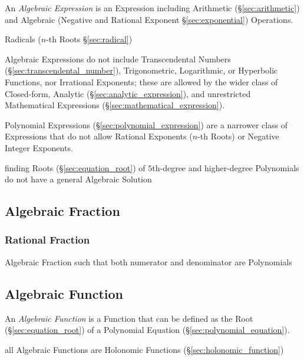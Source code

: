 An \emph{Algebraic Expression} is an Expression including Arithmetic
(\S\ref{sec:arithmetic}) and Algebraic (Negative and Rational Exponent
\S\ref{sec:exponential}) Operations.

Radicals ($n$-th Roots \S\ref{sec:radical})

Algebraic Expressions do not include Transcendental Numbers
(\S\ref{sec:transcendental_number}), Trigonometric, Logarithmic, or Hyperbolic
Functions, nor Irrational Exponents; these are allowed by the wider class of
Closed-form, Analytic (\S\ref{sec:analytic_expression}), and unrestricted
Mathematical Expressions (\S\ref{sec:mathematical_expression}).

\fist Polynomial Expressions (\S\ref{sec:polynomial_expression}) are a narrower
class of Expressions that do not allow Rational Exponents ($n$-th Roots) or
Negative Integer Exponents.

finding Roots (\S\ref{sec:equation_root}) of $5$th-degree and higher-degree
Polynomials do not have a general Algebraic Solution



\subsection{Algebraic Fraction}\label{sec:algebraic_fraction}

\subsubsection{Rational Fraction}\label{sec:rational_fraction}

Algebraic Fraction such that both numerator and denominator are Polynomials



\subsection{Algebraic Function}\label{sec:algebraic_function}

An \emph{Algebraic Function} is a Function that can be defined as the Root
(\S\ref{sec:equation_root}) of a Polynomial Equation
(\S\ref{sec:polynomial_equation}).

all Algebraic Functions are Holonomic Functions
(\S\ref{sec:holonomic_function})



